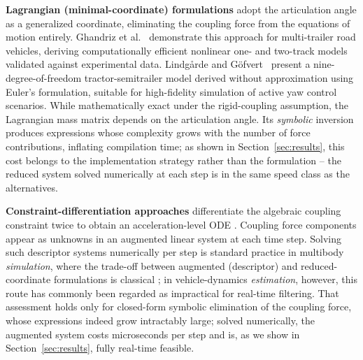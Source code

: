 \documentclass[conference]{IEEEtran}
\begin{document}
\textbf{Lagrangian (minimal-coordinate) formulations} adopt the articulation angle as a generalized coordinate, eliminating the coupling force from the equations of motion entirely. Ghandriz et al.~\cite{ghandriz_computationally_2020} demonstrate this approach for multi-trailer road vehicles, deriving computationally efficient nonlinear one- and two-track models validated against experimental data. Lindgårde and Göfvert~\cite{lindgrde_9-dof_2004} present a nine-degree-of-freedom tractor-semitrailer model derived without approximation using Euler's formulation, suitable for high-fidelity simulation of active yaw control scenarios. While mathematically exact under the rigid-coupling assumption, the Lagrangian mass matrix depends on the articulation angle. Its \emph{symbolic} inversion produces expressions whose complexity grows with the number of force contributions, inflating compilation time; as shown in Section~\ref{sec:results}, this cost belongs to the implementation strategy rather than the formulation -- the reduced system solved numerically at each step is in the same speed class as the alternatives.

\textbf{Constraint-differentiation approaches} differentiate the algebraic coupling constraint twice to obtain an acceleration-level ODE \cite{shabana_dynamics_2020}. Coupling force components appear as unknowns in an augmented linear system at each time step. Solving such descriptor systems numerically per step is standard practice in multibody \emph{simulation}, where the trade-off between augmented (descriptor) and reduced-coordinate formulations is classical \cite{bayo_augmented_1996, wehage_generalized_1982}; in vehicle-dynamics \emph{estimation}, however, this route has commonly been regarded as impractical for real-time filtering. That assessment holds only for closed-form symbolic elimination of the coupling force, whose expressions indeed grow intractably large; solved numerically, the augmented system costs microseconds per step and is, as we show in Section~\ref{sec:results}, fully real-time feasible.
\end{document}
